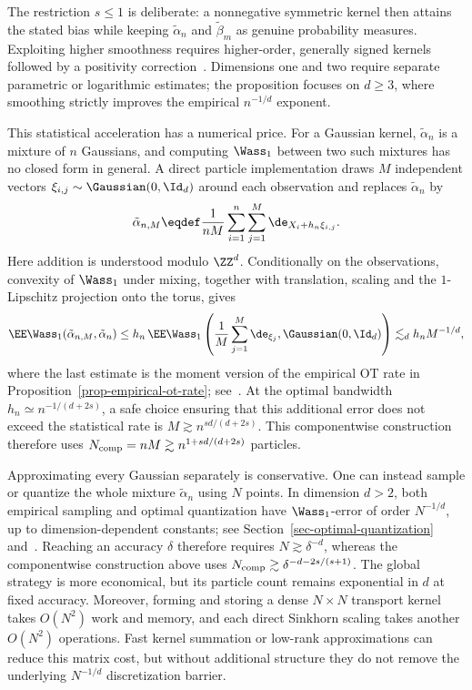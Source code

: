 The restriction \(s\leq1\) is deliberate: a nonnegative symmetric kernel then attains the stated bias while keeping \(\tilde\alpha_n\) and \(\tilde\beta_m\) as genuine probability measures. Exploiting higher smoothness requires higher-order, generally signed kernels followed by a positivity correction~\cite{divol2022measure}. Dimensions one and two require separate parametric or logarithmic estimates; the proposition focuses on \(d\geq3\), where smoothing strictly improves the empirical \(n^{-1/d}\) exponent.

This statistical acceleration has a numerical price. For a Gaussian kernel, \(\tilde\alpha_n\) is a mixture of \(n\) Gaussians, and computing \(\Wass_1\) between two such mixtures has no closed form in general. A direct particle implementation draws \(M\) independent vectors \(\xi_{i,j}\sim\Gaussian(0,\Id_d)\) around each observation and replaces \(\tilde\alpha_n\) by
\[
	\tilde\alpha_{n,M}
	\eqdef
	\frac1{nM}\sum_{i=1}^n\sum_{j=1}^M
	\de_{X_i+h_n\xi_{i,j}}.
\]
Here addition is understood modulo \(\ZZ^d\). Conditionally on the observations, convexity of \(\Wass_1\) under mixing, together with translation, scaling and the \(1\)-Lipschitz projection onto the torus, gives
\[
	\EE\Wass_1(\tilde\alpha_{n,M},\tilde\alpha_n)
	\leq
	h_n\,\EE\Wass_1\left(\frac1M\sum_{j=1}^M\de_{\xi_j},\Gaussian(0,\Id_d)\right)
	\lesssim_d h_nM^{-1/d},
\]
where the last estimate is the moment version of the empirical OT rate in Proposition~\ref{prop-empirical-ot-rate}; see~\cite{fournier2015rate}. At the optimal bandwidth \(h_n\simeq n^{-1/(d+2s)}\), a safe choice ensuring that this additional error does not exceed the statistical rate is \(M\gtrsim n^{sd/(d+2s)}\). This componentwise construction therefore uses \(N_{\rm comp}=nM\gtrsim n^{1+sd/(d+2s)}\) particles.

Approximating every Gaussian separately is conservative. One can instead sample or quantize the whole mixture \(\tilde\alpha_n\) using \(N\) points. In dimension \(d>2\), both empirical sampling and optimal quantization have \(\Wass_1\)-error of order \(N^{-1/d}\), up to dimension-dependent constants; see Section~\ref{sec-optimal-quantization} and~\cite{graf2000foundationsquantization}. Reaching an accuracy \(\delta\) therefore requires \(N\gtrsim\delta^{-d}\), whereas the componentwise construction above uses \(N_{\rm comp}\gtrsim\delta^{-d-2s/(s+1)}\). The global strategy is more economical, but its particle count remains exponential in \(d\) at fixed accuracy. Moreover, forming and storing a dense \(N\times N\) transport kernel takes \(O(N^2)\) work and memory, and each direct Sinkhorn scaling takes another \(O(N^2)\) operations. Fast kernel summation or low-rank approximations can reduce this matrix cost, but without additional structure they do not remove the underlying \(N^{-1/d}\) discretization barrier.


